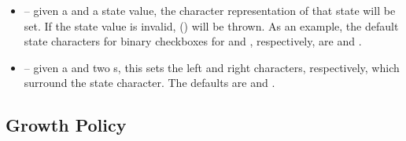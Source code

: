 \begin{itemize}
\item {} -- given a  and a state value,
  the character representation of that state will be set.  If the
  state value is invalid,  ()
  will be thrown.  As an example, the default state characters for
  binary checkboxes for  and , respectively, are
   and .
\item {} -- given a  and two
  s, this sets the left and right characters, respectively,
  which surround the state character.  The defaults are \fw{'['} and
    \fw{']'}.
\end{itemize}

\subsection{Growth Policy}
